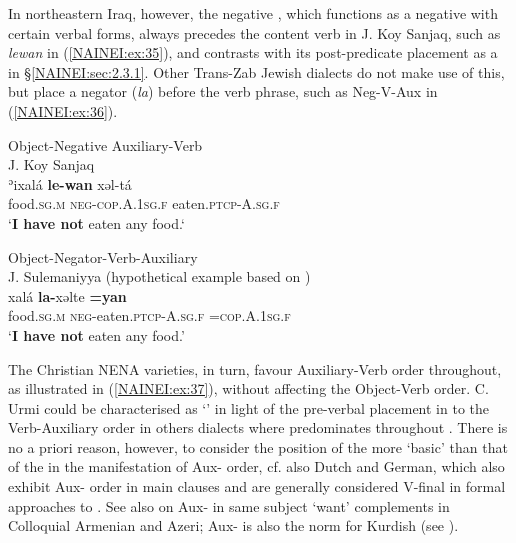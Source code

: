 \documentclass[output=paper,colorlinks,citecolor=brown,draftmode]{langscibook}
\begin{document}
In northeastern Iraq, however, the negative , which functions as a negative  with certain verbal forms, always precedes the content verb in J. Koy Sanjaq, such as \textit{lewan} in (\ref{NAINEI:ex:35}), and contrasts with its post-predicate placement as a  \parencite[108]{Mutzafi2004Koya} in §\ref{NAINEI:sec:2.3.1}. Other Trans-Zab Jewish dialects do not make use of this, but place a negator (\textit{la}) before the verb phrase, such as Neg-V-Aux in (\ref{NAINEI:ex:36}). 

\ea\label{NAINEI:ex:35}
Object-Negative Auxiliary-Verb\\
J. Koy Sanjaq \citep[2A:\S 4]{Mutzafi2004Koya} \\
\gll ʾixalá \textbf{le-wan} xəl-tá \\
     food\textsc{.sg.m} \textsc{neg-cop.A.1sg.f} eaten\textsc{.ptcp-A.sg.f} \\
\glt `\textbf{I have not} eaten any food.`
\z

\ea\label{NAINEI:ex:36}
Object-Negator-Verb-Auxiliary\\
J. Sulemaniyya (hypothetical example based on \citealt{Khan2004SuleyHalab})\\
\gll xalá \textbf{la-}xəlte \textbf{=yan} \\
     food\textsc{.sg.m} \textsc{neg-}eaten\textsc{.ptcp-A.sg.f} \textsc{=cop.A.1sg.f} \\
\glt `\textbf{I have not} eaten any food.'
\z

The Christian NENA varieties, in turn, favour Auxiliary-Verb order throughout, as illustrated in (\ref{NAINEI:ex:37}), without affecting the Object-Verb order.  C. Urmi could be characterised as `' in light of the pre-verbal  placement in  to the Verb-Auxiliary order in others dialects where  predominates throughout \parencite[399]{Khan2020ContactChange}. There is no a priori reason, however, to consider the position of the  more `basic' than that of the  in the manifestation of Aux- order, cf. also Dutch and German, which also exhibit Aux- order in main clauses and are generally considered V-final in formal approaches to . See also \citet[345]{Stilo2015AIAtlas} on Aux- in same subject `want' complements in Colloquial Armenian and Azeri; Aux- is also the norm for Kurdish (see ).
\end{document}
